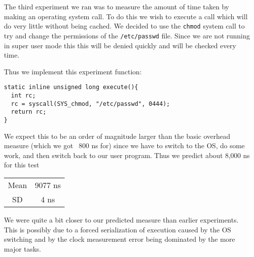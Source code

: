 The third experiment we ran was to measure the amount of time taken by making an operating system call.
To do this we wish to execute a call which will do very little without being cached.  
We decided to use the {\tt chmod} system call to try and change the permissions of the {\tt /etc/passwd} file.
Since we are not running in super user mode this this will be denied quickly and will be checked every time.

Thus we implement this experiment function: 
\begin{verbatim}
static inline unsigned long execute(){
  int rc;
  rc = syscall(SYS_chmod, "/etc/passwd", 0444);
  return rc;
}
\end{verbatim}

We expect this to be an order of magnitude larger than the basic overhead measure (which we got ~800 ns for) since we have to switch to the OS, do some work, and then switch back to our user program.  Thus we predict about 8,000 ns for this test

\begin{table}[h]
\centering
\begin{tabular}{|c|c|}\hline
Mean & 9077 ns \\
SD & 4 ns\\\hline
\end{tabular}
\end{table}

We were quite a bit closer to our predicted measure than earlier experiments.  This is possibly due to a forced serialization of execution caused by the OS switching and by the clock measurement error being dominated by the more major tasks.